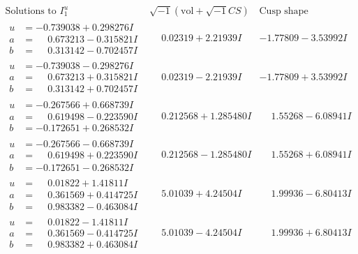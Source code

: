 \documentclass[1p]{elsarticle_modified}
\theoremstyle{definition}
\newcommand{\I}{\sqrt{-1}}
\begin{document}
$$\begin{array}{c|c|c}  
\text{Solutions to }I^u_{1}& \I (\text{vol} + \sqrt{-1}CS) & \text{Cusp shape}\\
 \hline 
\begin{aligned}
u &= -0.739038 + 0.298276 I \\
a &= \phantom{-}0.673213 - 0.315821 I \\
b &= \phantom{-}0.313142 - 0.702457 I\end{aligned}
 & \phantom{-}0.02319 + 2.21939 I & -1.77809 - 3.53992 I \\ \hline\begin{aligned}
u &= -0.739038 - 0.298276 I \\
a &= \phantom{-}0.673213 + 0.315821 I \\
b &= \phantom{-}0.313142 + 0.702457 I\end{aligned}
 & \phantom{-}0.02319 - 2.21939 I & -1.77809 + 3.53992 I \\ \hline\begin{aligned}
u &= -0.267566 + 0.668739 I \\
a &= \phantom{-}0.619498 - 0.223590 I \\
b &= -0.172651 + 0.268532 I\end{aligned}
 & \phantom{-}0.212568 + 1.285480 I & \phantom{-}1.55268 - 6.08941 I \\ \hline\begin{aligned}
u &= -0.267566 - 0.668739 I \\
a &= \phantom{-}0.619498 + 0.223590 I \\
b &= -0.172651 - 0.268532 I\end{aligned}
 & \phantom{-}0.212568 - 1.285480 I & \phantom{-}1.55268 + 6.08941 I \\ \hline\begin{aligned}
u &= \phantom{-}0.01822 + 1.41811 I \\
a &= \phantom{-}0.361569 + 0.414725 I \\
b &= \phantom{-}0.983382 - 0.463084 I\end{aligned}
 & \phantom{-}5.01039 + 4.24504 I & \phantom{-}1.99936 - 6.80413 I \\ \hline\begin{aligned}
u &= \phantom{-}0.01822 - 1.41811 I \\
a &= \phantom{-}0.361569 - 0.414725 I \\
b &= \phantom{-}0.983382 + 0.463084 I\end{aligned}
 & \phantom{-}5.01039 - 4.24504 I & \phantom{-}1.99936 + 6.80413 I \\ \hline\begin{aligned}

\end{aligned}
\end{array}$$
\end{document}
